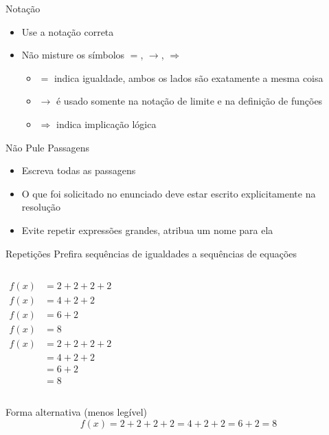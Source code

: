 \begin{frame}{Notação}
  \begin{itemize}[<+->]
    \item Use a notação correta
    \item Não misture os símbolos\; $=$,\; $\to$,\; $\Rightarrow$
    \begin{itemize}
      \item \emph{$=$}           \tabto{8mm} indica igualdade, ambos os lados são exatamente a mesma coisa
      \item \emph{$\to$}         \tabto{8mm} é usado somente na notação de limite e na definição de funções
      \item \emph{$\Rightarrow$} \tabto{8mm} indica implicação lógica \\[3mm]
    \end{itemize}
  \end{itemize}
\end{frame}

\begin{frame}{Não Pule Passagens}
  \begin{itemize}[<+->]
    \item Escreva todas as passagens
    \item O que foi solicitado no enunciado deve estar escrito explicitamente na resolução
    \item Evite repetir expressões grandes, atribua um nome para ela
  \end{itemize}
\end{frame}

\begin{frame}{Repetições}
Prefira sequências de igualdades a sequências de equações
\begin{columns}
  \pause
  \begin{align*}
    f(x) & = 2 + 2 + 2 + 2 \\
    f(x) & = 4 + 2 + 2     \\
    f(x) & = 6 + 2         \\
    f(x) & = 8
  \end{align*}
  \pause
  \begin{align*}
    f(x) & = 2 + 2 + 2 + 2 \\
         & = 4 + 2 + 2     \\
         & = 6 + 2         \\
         & = 8
  \end{align*}
\end{columns}

\pause
\vspace{\baselineskip}
Forma alternativa (menos legível)
\[
  f(x)
  = 2 + 2 + 2 + 2
  = 4 + 2 + 2
  = 6 + 2
  = 8
\]
\end{frame}

